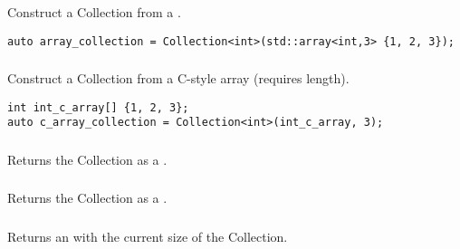 \subsubsection{}

Construct a Collection from a .

\begin{lstlisting}[title=example]
auto array_collection = Collection<int>(std::array<int,3> {1, 2, 3});
\end{lstlisting}




\subsubsection{}

Construct a Collection from a C-style array (requires length).

\begin{lstlisting}[title=example]
int int_c_array[] {1, 2, 3};
auto c_array_collection = Collection<int>(int_c_array, 3);
\end{lstlisting}




\subsubsection{}

Returns the Collection as a .




\subsubsection{}

Returns the Collection as a .




\subsubsection{}

Returns an  with the current size of the Collection.




\subsubsection{}

